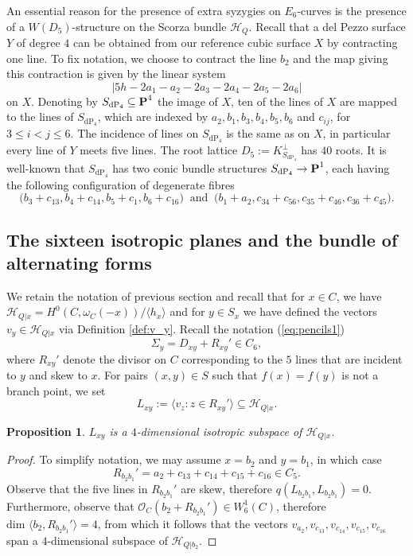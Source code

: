\documentclass[11pt]{amsart}
\newtheorem{proposition}[theorem]{Proposition}
\theoremstyle{definition}
\def\PP{{\textbf P}}
\def\OO{\mathcal{O}}
\def\cH{\mathcal{H}}
\begin{document}
An essential reason for the presence of extra syzygies on $E_6$-curves is the presence of a $W(D_5)$-structure on the Scorza bundle $\cH_Q$. Recall that a del Pezzo surface  $Y$ of degree $4$ can be obtained from our reference cubic surface $X$ by contracting one line. To fix notation, we choose to contract the line $b_2$ and the map giving this contraction is given by the linear system $$|5h-2a_1-a_2-2a_3-2a_4-2a_5-2a_6|$$ on $X$. Denoting by $S_{\mathrm{dP}_4}\subseteq \PP^4$ the image of $X$, ten of the lines of $X$ are mapped to the lines of $S_{\mathrm{dP}_4}$, which are indexed by $a_2, b_1,b_3,b_4,b_5, b_6$ and $c_{ij}$, for $3\leq i<j\leq 6$. The incidence of lines on $S_{\mathrm{dP}_4}$ is the same as on $X$, in particular every line of $Y$ meets five lines. The root lattice $D_5:=K_{S_{\mathrm{dP}_4}}^{\perp}$ has $40$ roots. It is well-known that $S_{\mathrm{dP}_4}$ has two conic bundle structures $S_{\mathrm{dP}_4}\rightarrow \PP^1$, each having the following configuration of degenerate fibres
\begin{equation}\label{eq;dp4}
\bigl(b_3+c_{13}, b_4+c_{14}, b_5+c_{1}, b_6+c_{16}\bigr)\  \mbox{ and } \  \bigl(b_1+a_2, c_{34}+c_{56}, c_{35}+c_{46}, c_{36}+c_{45}\bigr).
\end{equation}

\subsection{The sixteen isotropic planes and the bundle
of alternating forms}

We retain the notation of previous section and recall that for $x\in C$, we have  $\cH_{Q|x}=H^0(C,\omega_C(-x))/\langle h_x\rangle$ and for $y\in S_x$ we have defined the vectors $v_y\in \cH_{Q|x}$ via Definition \ref{def:v_y}. Recall  the notation (\ref{eq:pencils1})
$$\Sigma_y=D_{xy}+R_{xy}'\in C_6,$$
where $R_{xy}'$ denote the divisor on $C$ corresponding to the $5$ lines that are incident to $y$ and skew to $x$. For pairs $(x,y)\in S$ such that $f(x)=f(y)$ is not a branch point, we set 
$$
L_{xy}:=
\langle v_z:z\in R_{xy}'\rangle
\subseteq \mathcal H_{Q|x}.
$$

\begin{proposition}\label{prop:l_xy}
$L_{xy}$ is a $4$-dimensional isotropic subspace of $\cH_{Q|x}$.
\end{proposition}
\begin{proof}
To simplify notation, we may assume $x=b_2$ and $y=b_1$, in which case $$R_{b_2 b_1}'=a_2+c_{13}+c_{14}+c_{15}+c_{16}\in C_5.$$ Observe that the five lines in $R_{b_2 b_1}'$ are skew, therefore $q(L_{b_2 b_1}, L_{b_2 b_1})=0$. Furthermore, observe that $\OO_C(b_2+R_{b_2 b_1}')\in W^1_6(C)$, therefore 
$\mbox{dim } \langle b_2, R_{b_2 b_1}'\rangle =4$, from which it follows that the vectors $v_{a_2}, v_{c_{13}}, v_{c_{14}}, v_{c_{15}}, v_{c_{16}}$ span a $4$-dimensional subspace of $\cH_{Q|b_2}$. 
\end{proof}
\end{document}

